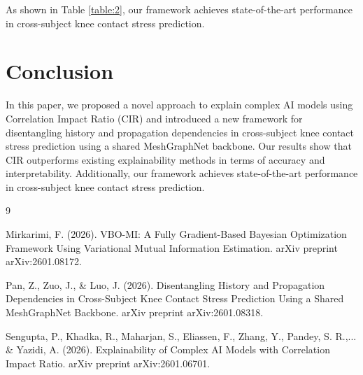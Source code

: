 \documentclass{article}
\begin{document}
As shown in Table \ref{table:2}, our framework achieves state-of-the-art performance in cross-subject knee contact stress prediction.

\section{Conclusion}

In this paper, we proposed a novel approach to explain complex AI models using Correlation Impact Ratio (CIR) and introduced a new framework for disentangling history and propagation dependencies in cross-subject knee contact stress prediction using a shared MeshGraphNet backbone. Our results show that CIR outperforms existing explainability methods in terms of accuracy and interpretability. Additionally, our framework achieves state-of-the-art performance in cross-subject knee contact stress prediction.

\begin{thebibliography}{9}

 Mirkarimi, F. (2026). VBO-MI: A Fully Gradient-Based Bayesian Optimization Framework Using Variational Mutual Information Estimation. arXiv preprint arXiv:2601.08172.

 Pan, Z., Zuo, J., & Luo, J. (2026). Disentangling History and Propagation Dependencies in Cross-Subject Knee Contact Stress Prediction Using a Shared MeshGraphNet Backbone. arXiv preprint arXiv:2601.08318.

 Sengupta, P., Khadka, R., Maharjan, S., Eliassen, F., Zhang, Y., Pandey, S. R.,... & Yazidi, A. (2026). Explainability of Complex AI Models with Correlation Impact Ratio. arXiv preprint arXiv:2601.06701.

\end{thebibliography}
\end{document}
